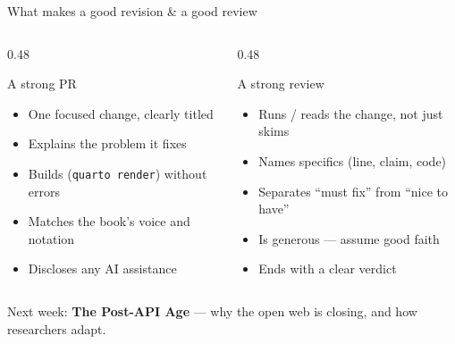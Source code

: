 \documentclass[9pt,aspectratio=169]{beamer}
\begin{document}
\begin{frame}{What makes a good revision \& a good review}
    \begin{columns}[T]
        \begin{column}{0.48\textwidth}
            \begin{block}{A strong PR}
                \begin{itemize}\small
                    \item One focused change, clearly titled
                    \item Explains the problem it fixes
                    \item Builds (\texttt{quarto render}) without errors
                    \item Matches the book's voice and notation
                    \item Discloses any AI assistance
                \end{itemize}
            \end{block}
        \end{column}
        \begin{column}{0.48\textwidth}
            \begin{block}{A strong review}
                \begin{itemize}\small
                    \item Runs / reads the change, not just skims
                    \item Names specifics (line, claim, code)
                    \item Separates ``must fix'' from ``nice to have''
                    \item Is generous --- assume good faith
                    \item Ends with a clear verdict
                \end{itemize}
            \end{block}
        \end{column}
    \end{columns}
    \vspace{0.5em}
    \centering\small Next week: \textbf{The Post-API Age} --- why the open web is closing, and how researchers adapt.
\end{frame}
\end{document}

